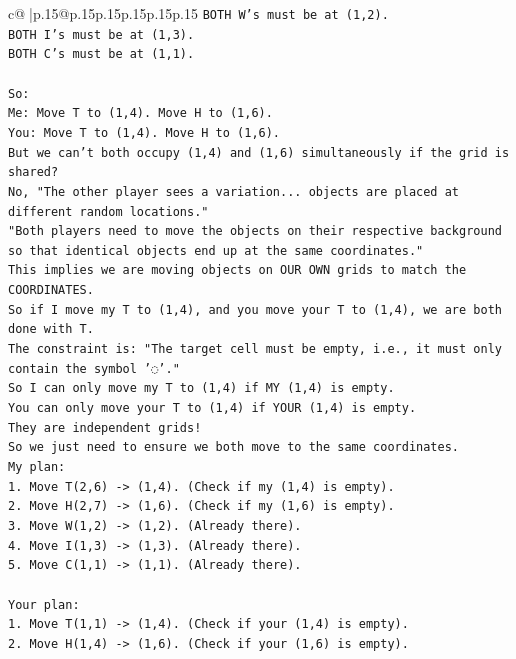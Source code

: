 \documentclass{article}
\begin{document}
{\begin{supertabular}{c@{$\;$}|p{.15\linewidth}@{}p{.15\linewidth}p{.15\linewidth}p{.15\linewidth}p{.15\linewidth}p{.15\linewidth}}
{{{\texttt{BOTH W's must be at (1,2).} \\
\texttt{BOTH I's must be at (1,3).} \\
\texttt{BOTH C's must be at (1,1).} \\
\\ 
\texttt{So:} \\
\texttt{Me: Move T to (1,4). Move H to (1,6).} \\
\texttt{You: Move T to (1,4). Move H to (1,6).} \\
\texttt{But we can't both occupy (1,4) and (1,6) simultaneously if the grid is shared?} \\
\texttt{No, "The other player sees a variation... objects are placed at different random locations."} \\
\texttt{"Both players need to move the objects on their respective background so that identical objects end up at the same coordinates."} \\
\texttt{This implies we are moving objects on OUR OWN grids to match the COORDINATES.} \\
\texttt{So if I move my T to (1,4), and you move your T to (1,4), we are both done with T.} \\
\texttt{The constraint is: "The target cell must be empty, i.e., it must only contain the symbol '◌'."} \\
\texttt{So I can only move my T to (1,4) if MY (1,4) is empty.} \\
\texttt{You can only move your T to (1,4) if YOUR (1,4) is empty.} \\
\texttt{They are independent grids!} \\
\texttt{So we just need to ensure we both move to the same coordinates.} \\
\texttt{My plan:} \\
\texttt{1. Move T(2,6) {-}> (1,4). (Check if my (1,4) is empty).} \\
\texttt{2. Move H(2,7) {-}> (1,6). (Check if my (1,6) is empty).} \\
\texttt{3. Move W(1,2) {-}> (1,2). (Already there).} \\
\texttt{4. Move I(1,3) {-}> (1,3). (Already there).} \\
\texttt{5. Move C(1,1) {-}> (1,1). (Already there).} \\
\\ 
\texttt{Your plan:} \\
\texttt{1. Move T(1,1) {-}> (1,4). (Check if your (1,4) is empty).} \\
\texttt{2. Move H(1,4) {-}> (1,6). (Check if your (1,6) is empty).} \\
}}}
\end{supertabular}}
\end{document}
